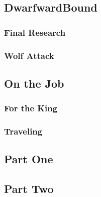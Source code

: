 

\subsection{DwarfwardBound}


\subsubsection{Final Research}


\subsubsection{Wolf Attack}


\subsection{On the Job}


\subsubsection{For the King}


\subsubsection{Traveling}


\subsection{Part One}


\subsection{Part Two}


